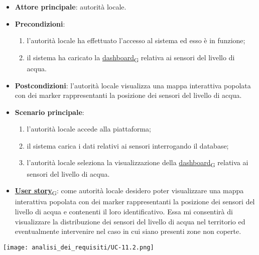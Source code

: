 \newpage

\begin{itemize}
	\item \textbf{Attore principale}: autorità locale.
	\item \textbf{Precondizioni}:
	      \begin{enumerate}
		      \item l'autorità locale ha effettuato l'accesso al sistema ed esso è in funzione;
		      \item il sistema ha caricato la \href{https://7last.github.io/docs/rtb/documentazione-interna/glossario\#dashboard}{dashboard\textsubscript{G}} relativa ai sensori del livello di acqua.
	      \end{enumerate}
	\item \textbf{Postcondizioni}: l'autorità locale visualizza una mappa interattiva popolata con dei marker rappresentanti la posizione dei sensori del livello di acqua.
	\item \textbf{Scenario principale}:
	      \begin{enumerate}
		      \item l'autorità locale accede alla piattaforma;
		      \item il sistema carica i dati relativi ai sensori interrogando il database;
		      \item l'autorità locale seleziona la visualizzazione della \href{https://7last.github.io/docs/rtb/documentazione-interna/glossario\#dashboard}{dashboard\textsubscript{G}} relativa ai sensori del livello di acqua.
	      \end{enumerate}
	\item \href{https://7last.github.io/docs/rtb/documentazione-interna/glossario\#user-story}{\textbf{User story}\textsubscript{G}}:
	      come autorità locale desidero poter visualizzare una mappa interattiva popolata con dei marker rappresentanti la posizione dei sensori del livello di acqua
	      e contenenti il loro identificativo. Essa mi consentirà di visualizzare la distribuzione dei sensori del livello di acqua nel territorio ed eventualmente intervenire nel caso in cui siano presenti zone non coperte.
\end{itemize}
\begin{center}
	\texttt{[image: analisi\_dei\_requisiti/UC-11.2.png]}
\end{center}

